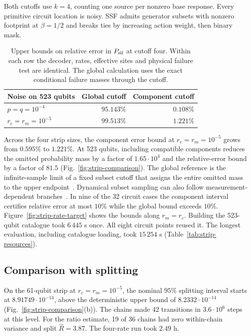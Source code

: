 \documentclass[10pt,twocolumn]{article}
\theoremstyle{definition}
\begin{document}
Both cutoffs use $k=4$, counting one source per nonzero base response.
Every primitive circuit location is noisy. SSF admits generator
subsets with nonzero footprint at $\beta=1/2$ and breaks ties by
increasing action weight, then binary mask.

\begin{table}[!htb]
\centering\small
\setlength{\tabcolsep}{4pt}
\caption{Upper bounds on relative error in $P_{\rm sil}$ at cutoff
four. Within each row the decoder, rates, effective sites and physical
failure test are identical. The global calculation uses the exact
conditional failure masses through the cutoff.}
\label{tab:strip-paired}
\smallskip
\begin{tabular}{@{}lrr@{}}
\toprule
Noise on 523 qubits & Global cutoff & Component cutoff\\
\midrule
$p=q=10^{-4}$ & $95.143\%$ & $0.108\%$\\
$r_c=r_m=10^{-5}$ & $99.513\%$ & $1.221\%$\\
\bottomrule
\end{tabular}
\end{table}


Across the four strip sizes, the component error bound at
$r_c=r_m=10^{-5}$ grows from $0.595\%$ to $1.221\%$. At 523 qubits,
including compatible components reduces the omitted probability mass
by a factor of $1.65\cdot10^4$ and the relative-error bound by a
factor of $81.5$ (Fig.~\ref{fig:strip-comparison}). The global
reference is the infinite-sample limit of a fixed subset cutoff that
assigns the entire omitted mass to the upper endpoint~\cite{GMB19}.
Dynamical subset sampling can also follow measurement-dependent
branches~\cite{HWRM24}. In nine of the 32 circuit cases the component
interval certifies relative error at most $10\%$ while the global bound
exceeds $10\%$. Figure~\ref{fig:strip-rate-target} shows the bounds along
$r_m=r_c$. Building the 523-qubit catalogue took $6\,445$ s once.
All eight circuit points reused it. The longest evaluation, including
catalogue loading, took $15\,254$ s (Table~\ref{tab:strip-resources}).

\subsection{Comparison with splitting}\label{sec:splitting-comparison}
On the 61-qubit strip at $r_c=r_m=10^{-5}$, the nominal $95\%$
splitting interval starts at $8.91749\cdot10^{-14}$, above the
deterministic upper bound of $8.2332\cdot10^{-14}$
(Fig.~\ref{fig:strip-comparison}(b)). The chains made 42 transitions
in $3.6\cdot10^6$ steps at this level. For the ratio estimate, 19 of
36 chains had zero within-chain variance and split $\widehat R=3.87$.
The four-rate run took $2.49$ h.
\end{document}
